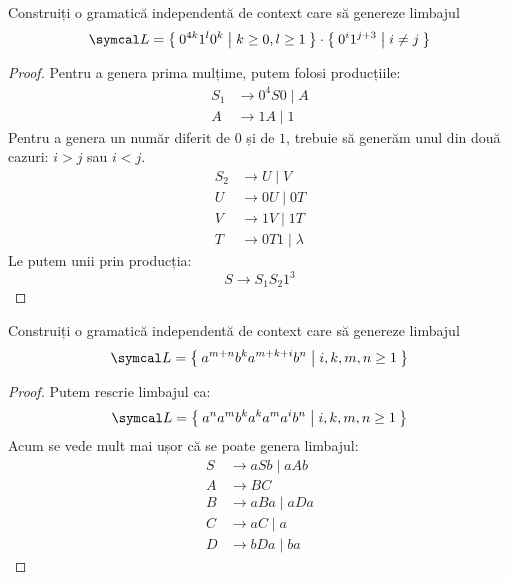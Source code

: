 \begin{exercise}
    Construiți o gramatică independentă de context care să genereze limbajul
    \[\limbaj = \Set{ 0^{4k} 1^l 0^k | k \geq 0, l \geq 1 } \cdot \Set{ 0^i 1^{j + 3} | i \neq j}\]
\end{exercise}
\begin{proof}
    Pentru a genera prima mulțime, putem folosi producțiile:
    \begin{align*}
        S_1 & \rightarrow 0^4 S 0 \mid A \\
        A   & \rightarrow 1 A \mid 1
    \end{align*}
    Pentru a genera un număr diferit de \(0\) și de \(1\), trebuie să generăm unul din două cazuri: \(i > j\) sau \(i < j\).
    \begin{align*}
        S_2 & \rightarrow U \mid V                     \\
        U   & \rightarrow 0 U \mid 0 T \tag{\(i > j\)} \\
        V   & \rightarrow 1 V \mid 1 T \tag{\(i < j\)} \\
        T   & \rightarrow 0 T 1 \mid \lambda
    \end{align*}
    Le putem unii prin producția:
    \[S \rightarrow S_1 S_2 1^3\]
\end{proof}

\begin{exercise}
    Construiți o gramatică independentă de context care să genereze limbajul
    \[\limbaj = \Set{ a^{m + n} b^k a^{m + k + i} b^n | i, k, m, n \geq 1 }\]
\end{exercise}
\begin{proof}
    Putem rescrie limbajul ca:
    \[\limbaj = \Set{ a^n a^m b^k a^k a^m a^i b^n | i, k, m, n \geq 1 }\]
    Acum se vede mult mai ușor că se poate genera limbajul:
    \begin{align*}
        S & \rightarrow a S b \mid a A b \tag{generează \(a^n \dots b^n\)} \\
        A & \rightarrow B C                                                \\
        B & \rightarrow a B a \mid a D a \tag{generează \(a^m \dots a^m\)} \\
        C & \rightarrow aC \mid a \tag{generează \(a^i\)}                  \\
        D & \rightarrow bDa \mid ba \tag{generează \(b^k a^k\)}
    \end{align*}
\end{proof}

